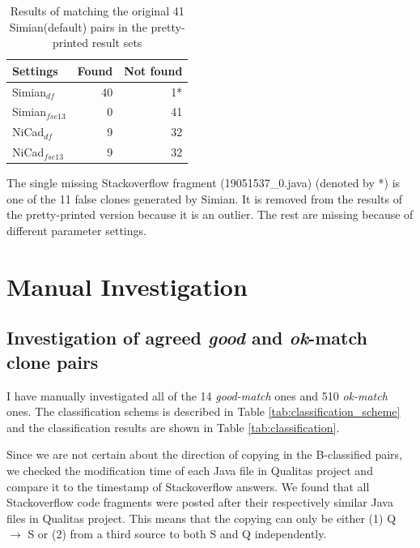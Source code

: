\documentclass{IEEEtran}
\begin{document}
\begin{table}[H]
	\centering
	\caption{Results of matching the original 41 Simian(default) pairs in the pretty-printed result sets}
	\label{tab:search}
	\begin{tabular}{l|r|r}
		\hline 
		Settings & Found & Not found \\ 
		\hline 
		Simian$_{df}$  &  40 & 1* \\ 
		\hline 
		Simian$_{fse13}$ & 0 & 41  \\ 
		\hline 
		NiCad$_{df}$  & 9 & 32 \\ 
		\hline 
		NiCad$_{fse13}$ &  9 & 32 \\ 
		\hline 
	\end{tabular} 
\end{table}

The single missing Stackoverflow fragment (19051537\_0.java) (denoted by *) is one of the 11 false clones generated by Simian. It is removed from the results of the pretty-printed version because it is an outlier. The rest are missing because of different parameter settings.


\section*{Manual Investigation}

\subsection{Investigation of agreed \textit{good} and \textit{ok}-match clone pairs}
I have manually investigated all of the 14 \textit{good-match} ones and 510 \textit{ok-match} ones. The classification schems is described in Table \ref{tab:classification_scheme} and the classification results are shown in Table \ref{tab:classification}. 

Since we are not certain about the direction of copying in the B-classified pairs, we checked the modification time of each Java file in Qualitas project and compare it to the timestamp of Stackoverflow answers. We found that all Stackoverflow code fragments were posted after their respectively similar Java files in Qualitas project. This means that the copying can only be either (1) Q $\rightarrow$ S or (2) from a third source to both S and Q independently.
\end{document}
